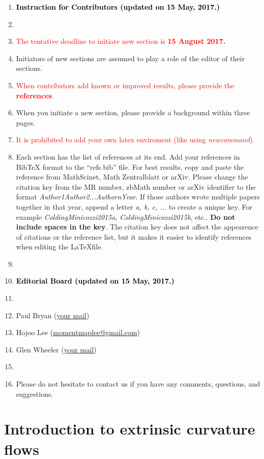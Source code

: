 \documentclass{amsart}
\theoremstyle{definition}
\begin{document}
\begin{enumerate}
\item[] \textbf{\textcolor{black}{Instruction for Contributors (updated on 15 May, 2017.)}}
\item[]
\item {\textcolor{red}{The tentative deadline to initiate new section is \textbf{15 August 2017.}}}
\item Initiators of new sections are assumed to play a role of the editor of their sections.
\item \textcolor{red}{When contributors add known or improved results, please provide the \textbf{references}.} 
\item When you initiate a new section, please provide a background within three pages. 
\item  {\textcolor{red}{It is prohibited to add your own latex enviroment (like using \textit{newcommand}).}} 
\item Each section has the list of references at its end. Add your references in BibTeX format to the ``refs.bib'' file. For best results, copy and paste the reference from MathScinet, Math Zentralblatt or arXiv. Please change the citation key from the MR number, zbMath number or arXiv identifier to the format \emph{Author1Author2...AuthornYear}. If those authors wrote multiple papers together in that year, append a letter \emph{a, b, c, ...} to create a unique key. For example \emph{ColdingMinicozzi2015a}, \emph{ColdingMinicozzi2015b}, etc.. \textbf{Do not include spaces in the key}. The citation key does not affect the appearence of citations or the reference list, but it makes it easier to identify references when editing the \LaTeX file.
\item[]
\item[] \textbf{\textcolor{black}{Editorial Board (updated on 15 May, 2017.)}}
\item[]
\item[] Paul Bryan  (\href{your mail}{your mail}) 
\item[] Hojoo Lee  (\href{momentmaplee@gmail.com}{momentmaplee@gmail.com}) 
\item[] Glen Wheeler  (\href{your mail}{your mail}) 
\item[]
\item[] Please do not hesitate to contact us if you have any comments, questions, and suggestions. 
\end{enumerate}

\section{Introduction to extrinsic curvature flows}
  
\end{document}
